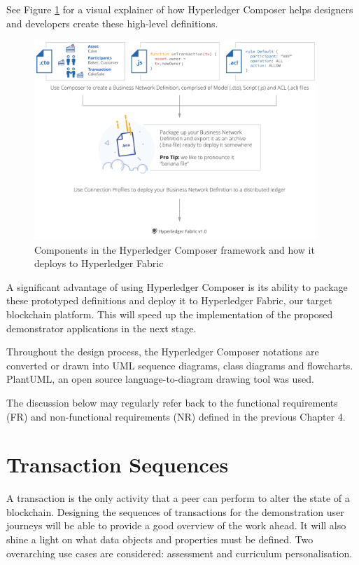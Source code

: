 See Figure \ref{fig:composer2fabric} for a visual explainer of how Hyperledger Composer
helps designers and developers create these high-level definitions.

\begin{figure}[!ht]
	\centering
	\includegraphics[width=0.95\textwidth]{composer2fabric}
	\caption[Hyperledger Composer]
	{Components in the Hyperledger Composer framework and how it deploys to
		Hyperledger Fabric \citep{cuicapuza2017composer}}
	\label{fig:composer2fabric}
\end{figure}

A significant advantage of using Hyperledger Composer is its ability to package these
prototyped definitions and deploy it to Hyperledger Fabric, our target blockchain platform.
This will speed up the implementation of the proposed demonstrator applications
in the next stage.

Throughout the design process, the Hyperledger Composer notations are converted or drawn into UML sequence
diagrams, class diagrams and flowcharts. PlantUML, an open source language-to-diagram drawing tool was used.

The discussion below may regularly refer back to the functional requirements (FR) and
non-functional requirements (NR) defined in the previous Chapter 4.

\section{Transaction Sequences}

A transaction is the only activity that a peer can perform to alter the state of a blockchain.
Designing the sequences of transactions for the demonstration user journeys will
be able to provide a good overview of the work ahead. It will also shine a light on
what data objects and properties must be defined. Two overarching use cases are considered:
assessment and curriculum personalisation.

